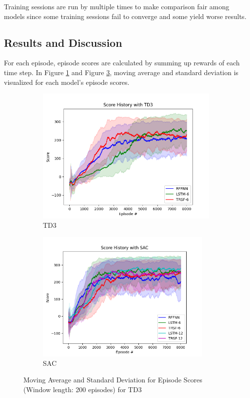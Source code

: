 \documentclass[a4paper, 12pt]{article} %
\begin{document}
Training sessions are run by multiple times to make comparison fair among models since some training sessions fail to converge and some yield worse results.

\subsection{Results and Discussion}

For each episode, episode scores are calculated by summing up rewards of each time step. 
In Figure \ref{fig:td3_std_ep_rewards} and Figure \ref{fig:sac_std_ep_rewards}, moving average and standard deviation is visualized for each model's episode scores. 

\begin{figure}[!ht]
	\centering
	\begin{subfigure}{.49\textwidth}
		\centering
		\includegraphics[width=0.99\textwidth]{figures/bipedal/STD_TD3_RFFNN_LSTM-6_TRSF-6.png}
		\caption{TD3}
		\label{fig:td3_std_ep_rewards}
	\end{subfigure}
	\begin{subfigure}{.49\textwidth}
		\centering
		\includegraphics[width=0.95\textwidth]{figures/bipedal/STD_SAC_RFFNN_LSTM-6_TRSF-6_LSTM-12_TRSF-12.png}
		\caption{SAC}
		\label{fig:sac_std_ep_rewards}
	\end{subfigure}
	\caption{Moving Average and Standard Deviation for Episode Scores (Window length: 200 episodes) for TD3}
\end{figure}
\end{document}
